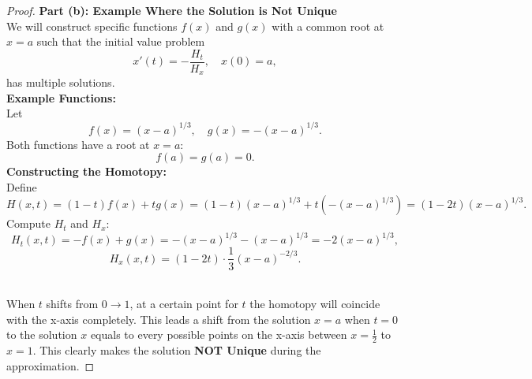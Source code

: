 \documentclass{article}
\begin{document}
\begin{proof}
    \textbf{Part (b): Example Where the Solution is Not Unique}
    \\
    We will construct specific functions \( f(x) \) and \( g(x) \) with a common root at \( x = a \) such that the initial value problem
    \[
        x'(t) = -\frac{H_t}{H_x}, \quad x(0) = a,
    \]
    has multiple solutions.
    \\
    \textbf{Example Functions:}
    \\
    Let
    \[
        f(x) = (x - a)^{1/3}, \quad g(x) = -(x - a)^{1/3}.
    \]
    Both functions have a root at \( x = a \):
    \[
        f(a) = g(a) = 0.
    \]
    \textbf{Constructing the Homotopy:}
    \\
    Define
    \[
        H(x, t) = (1 - t) f(x) + t g(x) = (1 - t)(x - a)^{1/3} + t ( - (x - a)^{1/3} ) = (1 - 2t)(x - a)^{1/3}.
    \]
    Compute \( H_t \) and \( H_x \):
    \[
        H_t(x, t) = -f(x) + g(x) = - (x - a)^{1/3} - (x - a)^{1/3} = -2 (x - a)^{1/3},
    \]
    \[
        H_x(x, t) = (1 - 2t) \cdot \frac{1}{3} (x - a)^{-2/3}.
    \]

    \\
    When $t$ shifts from $0 \to 1$, at a certain point for $t$ the homotopy will coincide with the x-axis completely. 
    This leads a shift from the solution $x=a$ when $t=0$ to the solution $x$ equals to every possible points on the x-axis between $x = \frac{1}{2}$ to $x = 1$.
    This clearly makes the solution \textbf{NOT Unique} during the approximation.

\end{proof}
\end{document}
